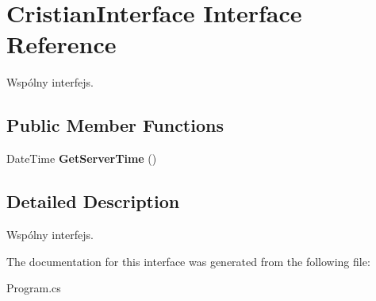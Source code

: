 \hypertarget{interface_cristian_interface}{\section{Cristian\+Interface Interface Reference}
\label{interface_cristian_interface}
}


Wspólny interfejs.  


\subsection*{Public Member Functions}
\begin{DoxyCompactItemize}
\item 
\hypertarget{interface_cristian_interface_a85bc7efa032f0cedfad7476ff9a644f3}{Date\+Time {\bfseries Get\+Server\+Time} ()}\label{interface_cristian_interface_a85bc7efa032f0cedfad7476ff9a644f3}

\end{DoxyCompactItemize}


\subsection{Detailed Description}
Wspólny interfejs. 

The documentation for this interface was generated from the following file\+:\begin{DoxyCompactItemize}
\item 
Program.\+cs\end{DoxyCompactItemize}

